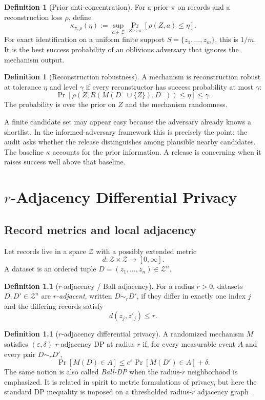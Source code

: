 \documentclass[11pt,a4paper]{report}
\theoremstyle{plain}
\theoremstyle{definition}
\newtheorem{definition}[theorem]{Definition}
\theoremstyle{remark}
\newcommand{\cZ}{\mathcal{Z}}
\begin{document}
\begin{definition}[Prior anti-concentration]
\label{def:kappa}
For a prior $\pi$ on records and a reconstruction loss $\rho$, define
\[
\kappa_{\pi,\rho}(\eta)
:=
\sup_{a\in\cZ}\Pr_{Z\sim\pi}[\rho(Z,a)\le \eta].
\]
For exact identification on a uniform finite support $S=\{z_1,\ldots,z_m\}$, this is $1/m$.  It is the best success probability of an oblivious adversary that ignores the mechanism output.
\end{definition}

\begin{definition}[Reconstruction robustness]
A mechanism is reconstruction robust at tolerance $\eta$ and level $\gamma$ if every reconstructor has success probability at most $\gamma$:
\[
\Pr[\rho(Z,R(M(D^-\cup\{Z\}),D^-))\le\eta]\le \gamma.
\]
The probability is over the prior on $Z$ and the mechanism randomness.
\end{definition}

A finite candidate set may appear easy because the adversary already knows a shortlist.  In the informed-adversary framework this is precisely the point: the audit asks whether the release distinguishes among plausible nearby candidates.  The baseline $\kappa$ accounts for the prior information.  A release is concerning when it raises success well above that baseline.

\chapter{$r$-Adjacency Differential Privacy}
\label{ch:r-adjacency}

\section{Record metrics and local adjacency}
\label{sec:record-metrics}

Let records live in a space $\cZ$ with a possibly extended metric
\[
 d:\cZ\times\cZ\to[0,\infty].
\]
A dataset is an ordered tuple $D=(z_1,\ldots,z_n)\in\cZ^n$.

\begin{definition}[$r$-adjacency / Ball adjacency]
For a radius $r>0$, datasets $D,D'\in\cZ^n$ are \emph{$r$-adjacent}, written $D\sim_r D'$, if they differ in exactly one index $j$ and the differing records satisfy
\[
 d(z_j,z'_j)\le r.
\]
\end{definition}

\begin{definition}[$r$-adjacency differential privacy]
A randomized mechanism $M$ satisfies $(\varepsilon,\delta)$ $r$-adjacency DP at radius $r$ if, for every measurable event $A$ and every pair $D\sim_r D'$,
\[
\Pr[M(D)\in A]\le e^\varepsilon \Pr[M(D')\in A]+\delta.
\]
The same notion is also called \emph{Ball-DP} when the radius-$r$ neighborhood is emphasized.  It is related in spirit to metric formulations of privacy, but here the standard DP inequality is imposed on a thresholded radius-$r$ adjacency graph~\cite{chatzikokolakis2013metrics,imola2022metricdp}.
\end{definition}
\end{document}
